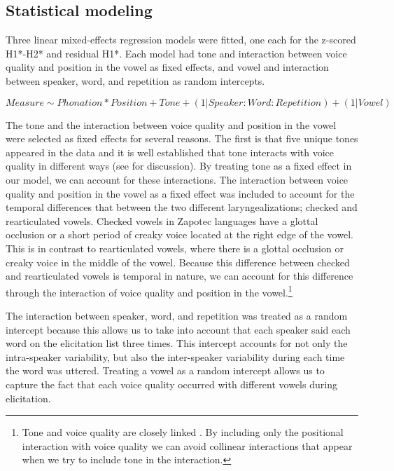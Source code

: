 \subsection{Statistical modeling} \label{sec:StatisticalModeling}

Three linear mixed-effects regression models were fitted, one each for the z-scored H1*-H2* and residual H1*. Each model had tone and interaction between voice quality and position in the vowel as fixed effects, and vowel and interaction between speaker, word, and repetition as random intercepts.

\begin{equation}
  Measure \sim  Phonation*Position + Tone + (1|Speaker:Word:Repetition) + (1|Vowel) 
\end{equation}

The tone and the interaction between voice quality and position in the vowel were selected as fixed effects for several reasons. The first is that five unique tones appeared in the data and it is well established that tone interacts with voice quality in different ways (see \cite{espositoCrossLinguisticPatterns2020,garellekPhoneticsVoice2019} for discussion). By treating tone as a fixed effect in our model, we can account for these interactions. The interaction between voice quality and position in the vowel as a fixed effect was included to account for the temporal differences that between the two different laryngealizations; checked and rearticulated vowels. Checked vowels in Zapotec languages have a glottal occlusion or a short period of creaky voice located at the right edge of the vowel. This is in contrast to rearticulated vowels, where there is a glottal occlusion or creaky voice in the middle of the vowel. Because this difference between checked and rearticulated vowels is temporal in nature, we can account for this difference through the interaction of voice quality and position in the vowel.\footnote{Tone and voice quality are closely linked . By including only the positional interaction with voice quality we can avoid collinear interactions that appear when we try to include tone in the interaction.}

The interaction between speaker, word, and repetition was treated as a random intercept because this allows us to take into account that each speaker said each word on the elicitation list three times. This intercept accounts for not only the intra-speaker variability, but also the inter-speaker variability during each time the word was uttered. Treating a vowel as a random intercept allows us to capture the fact that each voice quality occurred with different vowels during elicitation.

